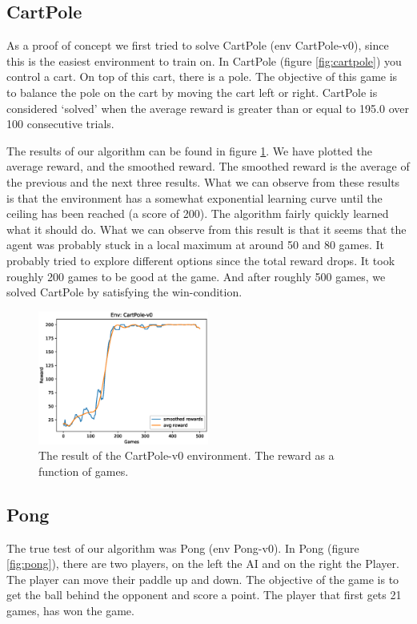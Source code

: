 \documentclass{article}
\begin{document}
\subsection{CartPole}
As a proof of concept we first tried to solve CartPole (env CartPole-v0), since this is the easiest environment to train on. In CartPole (figure \ref{fig:cartpole}) you control a cart. On top of this cart, there is a pole. The objective of this game is to balance the pole on the cart by moving the cart left or right. CartPole is considered `solved' when the average reward is greater than or equal to 195.0 over 100 consecutive trials.

The results of our algorithm can be found in figure \ref{fig:cartpole_results}. We have plotted the average reward, and the smoothed reward. The smoothed reward is the average of the previous and the next three results. What we can observe from these results is that the environment has a somewhat exponential learning curve until the ceiling has been reached (a score of 200). The algorithm fairly quickly learned what it should do. What we can observe from this result is that it seems that the agent was probably stuck in a local maximum at around 50 and 80 games. It probably tried to explore different options since the total reward drops. It took roughly 200 games to be good at the game. And after roughly 500 games, we solved CartPole by satisfying the win-condition.

\begin{figure}[H]
\centering
\includegraphics[width=0.5\textwidth]{images/cartpole_results.eps}
\caption{The result of the CartPole-v0 environment. The reward as a function of games.}
\label{fig:cartpole_results}
\end{figure}

\subsection{Pong}
The true test of our algorithm was Pong (env Pong-v0). In Pong (figure \ref{fig:pong}), there are two players, on the left the AI and on the right the Player. The player can move their paddle up and down. The objective of the game is to get the ball behind the opponent and score a point. The player that first gets 21 games, has won the game.
\end{document}
